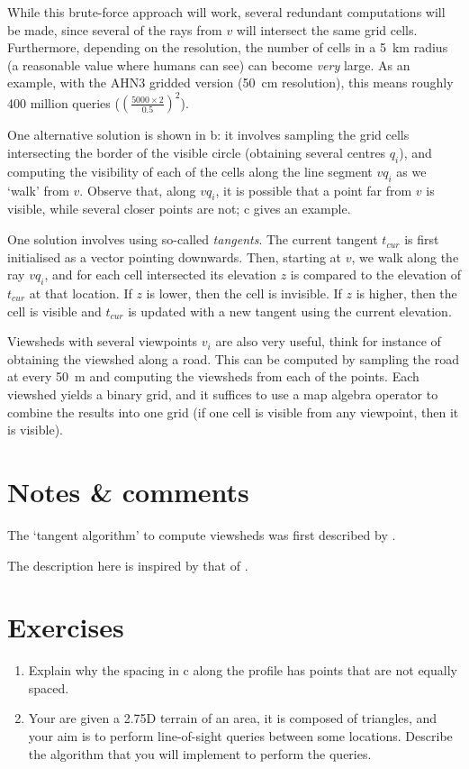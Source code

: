 %

While this brute-force approach will work, several redundant computations will be made, since several of the rays from $v$ will intersect the same grid cells.
Furthermore, depending on the resolution, the number of cells in a \qty{5}{\km} radius (a reasonable value where humans can see) can become \emph{very} large.
As an example, with the AHN3 gridded version (\qty{50}{\cm} resolution), this means roughly 400 million queries ($(\frac{5000 \times 2}{0.5})^2$).

%

One alternative solution is shown in b: it involves sampling the grid cells intersecting the border of the visible circle (obtaining several centres $q_i$), and computing the visibility of each of the cells along the line segment $vq_i$ as we `walk' from $v$.
Observe that, along $vq_i$, it is possible that a point far from $v$ is visible, while several closer points are not; c gives an example.

One solution involves using so-called \emph{tangents}.
The current tangent $t_{cur}$ is first initialised as a vector pointing downwards.
Then, starting at $v$, we walk along the ray $vq_i$, and for each cell intersected its elevation $z$ is compared to the elevation of $t_{cur}$ at that location.
If $z$ is lower, then the cell is invisible.
If $z$ is higher, then the cell is visible and $t_{cur}$ is updated with a new tangent using the current elevation.

Viewsheds with several viewpoints $v_i$ are also very useful, think for instance of obtaining the viewshed along a road.
This can be computed by sampling the road at every \qty{50}{\m} and computing the viewsheds from each of the points. 
Each viewshed yields a binary grid, and it suffices to use a map algebra operator to combine the results into one grid (if one cell is visible from any viewpoint, then it is visible).


%
\section{Notes \& comments}

The `tangent algorithm' to compute viewsheds was first described by \citet{Blelloch90}.

The description here is inspired by that of \citet{DeFloriani99-1}.


%
\section{Exercises}

\begin{enumerate}
  \item Explain why the spacing in c along the profile has points that are not equally spaced.
  \item Your are given a 2.75D terrain of an area, it is composed of triangles, and your aim is to perform line-of-sight queries between some locations. Describe the algorithm that you will implement to perform the queries.
\end{enumerate}
